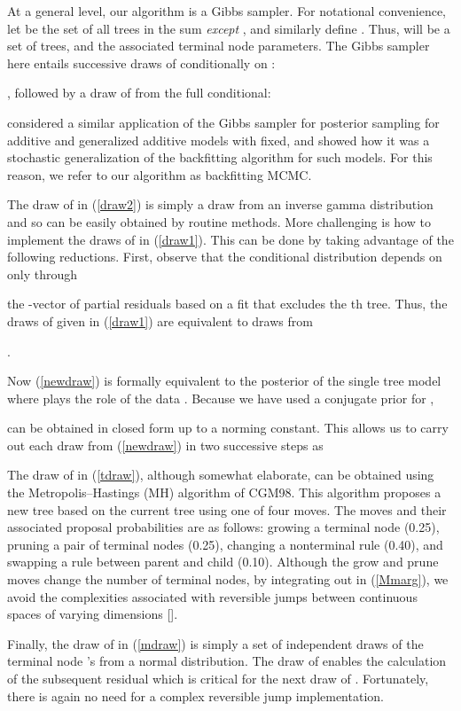 \documentclass[aoas,nameyear,dvips]{arximspdf}
\newcommand{\citeasnoun}[1]{\citet{#1}}
\begin{document}
At a general level, our algorithm is a Gibbs sampler.  For
notational convenience, let  be the set of all trees in
the sum \textit{except} , and similarly define . Thus,
 will be a set of  trees, and  the
associated terminal node parameters.  The Gibbs sampler here
entails  successive draws of  conditionally on
:

, followed by a draw of  from the full conditional:

\citeasnoun{HastTibs2000} considered a similar application of
the Gibbs sampler for posterior sampling for additive and
generalized additive models with  fixed, and showed how it
was a stochastic generalization of the backfitting algorithm for
such models.  For this reason, we refer to our algorithm as
backfitting MCMC.

The draw of  in (\ref{draw2}) is simply a draw from an
inverse gamma distribution and so can be easily obtained by
routine methods.  More challenging is how to implement the
 draws of  in (\ref{draw1}). This can be done by
taking advantage of the following reductions. First, observe that
the conditional distribution  depends on  only through

the -vector of partial residuals based on a fit that excludes
the th tree. Thus, the  draws of  given  in (\ref{draw1}) are equivalent to  draws
from

.

Now (\ref{newdraw}) is formally equivalent to the posterior of the
single tree model   where 
plays the role of the data .  Because we have used a conjugate
prior for ,

can be obtained in closed form up to a norming constant.  This
allows us to carry out each draw from (\ref{newdraw})
in two successive steps as


The draw of  in (\ref{tdraw}), although somewhat elaborate,
can be obtained using the Metropolis--Hastings (MH) algorithm of
CGM98. This algorithm proposes a new tree based on the current
tree using one of four moves.  The moves and their associated
proposal probabilities are as follows: growing a terminal node (0.25),
pruning a pair of terminal nodes (0.25), changing a nonterminal
rule (0.40), and swapping a rule between parent and child (0.10).
Although the grow and prune moves change the number of
terminal nodes,
by integrating out  in (\ref{Mmarg}), we
avoid the complexities associated with reversible jumps between
continuous spaces of varying dimensions [\citet{Gre1995}].

Finally, the draw of  in (\ref{mdraw}) is simply a set of
independent draws of the terminal node 's from a normal
distribution. The draw of  enables the calculation of the
subsequent residual  which is critical for the next draw
of . Fortunately, there is again no need for a complex
reversible jump implementation.
\end{document}
